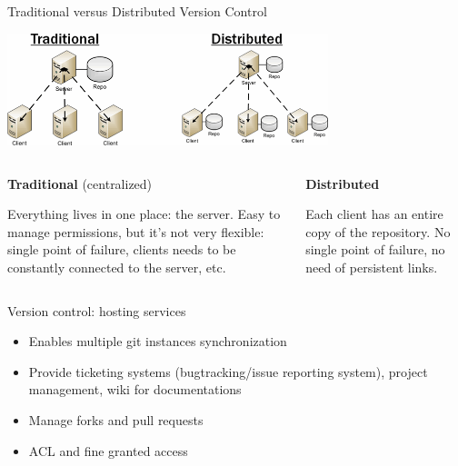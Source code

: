 \begin{frame}[fragile]{Traditional versus Distributed Version Control}

\begin{center}
\includegraphics[width=0.7\textwidth]{vc-centralized-distributed}
\end{center}

\begin{columns}
\begin{column}{0.5\textwidth}
   \textbf{Traditional} (centralized)

   Everything lives in one place: the server. Easy to manage permissions,
     but it's not very flexible: single point of failure, clients needs to be
     constantly connected to the server, etc.
\end{column}
\begin{column}{0.5\textwidth}
  \textbf{Distributed}

  Each client has an entire copy of the repository. No single point of failure,
  no need of persistent links.
\end{column}
\end{columns}

\end{frame}




\begin{frame}[fragile]{Version control: hosting services}
\begin{itemize}
  \item Enables multiple git instances synchronization
  \item Provide ticketing systems (bugtracking/issue reporting system), project
  management, wiki for documentations
  \item Manage forks and pull requests
  \item ACL and fine granted access
\end{itemize}
\end{frame}


